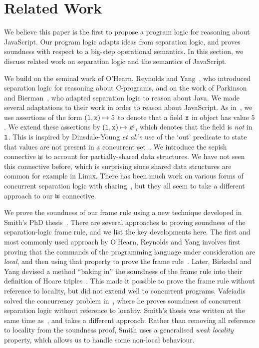 \documentclass{article}
\begin{document}
\renewcommand\und{\undl}







\section{Related Work}

We believe this paper is the first to propose a program logic for reasoning about JavaScript. Our program logic adapts ideas from separation logic, and proves soundness with respect to a big-step operational semantics.  In this section, we discuss related work on separation logic and the semantics of JavaScript.

We build on the seminal work of O'Hearn, Reynolds and Yang~\cite{DBLP:conf/csl/OHearnRY01}, who introduced separation logic for reasoning about C-programs, and on the work of Parkinson and Bierman~\cite{Parkinson05,ParkinsonB08,Bierman03mj:an},  who adapted separation logic to reason about Java. 
%
We made several adaptations 
to their work in order to reason about JavaScript. As in~\cite{Parkinson05,ParkinsonB08,Bierman03mj:an},  we use 
assertions of the form $(\mbox{\texttt{{\upshape l}}},\mbox{\texttt{{\upshape x}}})\mapsto 5$ to denote that 
a field $\mbox{\texttt{{\upshape x}}}$ in object  has value $5$. We extend these assertions by  $(\js{l},\js{x})\pointsto \none$, which denotes that the field is {\em not} in $\mbox{\texttt{{\upshape l}}}$.  This is inspired by Dinsdale-Young {\sl et al.}'s use of the `out' predicate to state that values are not present in a concurrent set~\cite{CAP}. We introduce the sepish connective $\mathbin{\sqcup\mkern-10mu*}$ to account for partially-shared data structures. 
We have not seen this connective before, which is surprising since shared data structures are common for example in Linux. There has been much work on various forms of concurrent separation logic with sharing~\cite{1236121,Vafeiadis07amarriage,denyguarantee}, but they all seem to take a different approach  to our $\mathbin{\sqcup\mkern-10mu*}$ connective. 

We prove the soundness of our frame rule using a new technique
developed in Smith's PhD thesis~\cite{gdsThesis}. There are several
approaches to proving soundness of the separation-logic frame rule,
and we list the key developments here. The first and most commonly used 
approach by O'Hearn, Reynolds and Yang involves first proving that the
commands of the programming language under consideration are {\em
  local}, and then using that property to prove the frame
rule~\cite{DBLP:conf/csl/OHearnRY01}. Later, Birkedal and Yang devised
a method ``baking in'' the soundness of the frame rule into their
definition of Hoare triples~\cite{DBLP:conf/fossacs/BirkedalY07}. This
made it possible to prove the frame rule without reference to
locality, but did not extend well to concurrent programs. Vafeiadis
solved the concurrency problem in~\cite{MFPS11}, where he proves
soundness of concurrent separation logic without reference to
locality. Smith's thesis was written at the same time
as~\cite{MFPS11}, and takes a different approach. Rather than removing
all reference to locality from the soundness proof, Smith uses a
generalised {\em weak locality} property, which allows us to handle
some non-local behaviour.
\end{document}
